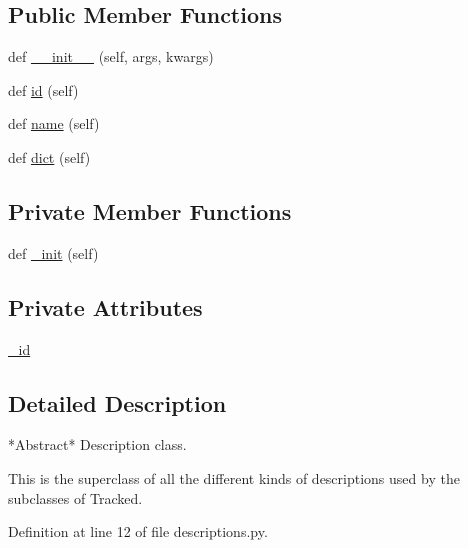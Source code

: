 \subsection*{Public Member Functions}
\begin{DoxyCompactItemize}
\item 
def \hyperlink{classmemoryoracle_1_1descriptions_1_1Description_a4fb6dc4bf9be65d6d1b135a9af46af38}{\+\_\+\+\_\+init\+\_\+\+\_\+} (self, args, kwargs)
\item 
def \hyperlink{classmemoryoracle_1_1descriptions_1_1Description_a793ffb6975ee167869a1f475b1748769}{id} (self)
\item 
def \hyperlink{classmemoryoracle_1_1descriptions_1_1Description_a4b27c3ae1ef0ab35ec0f990fa553b8b3}{name} (self)
\item 
def \hyperlink{classmemoryoracle_1_1descriptions_1_1Description_ab09bce45e6b9a038366ef720a5253506}{dict} (self)
\end{DoxyCompactItemize}
\subsection*{Private Member Functions}
\begin{DoxyCompactItemize}
\item 
def \hyperlink{classmemoryoracle_1_1descriptions_1_1Description_a61b082efab73e7121ad7321bd5d21b84}{\+\_\+init} (self)
\end{DoxyCompactItemize}
\subsection*{Private Attributes}
\begin{DoxyCompactItemize}
\item 
\hyperlink{classmemoryoracle_1_1descriptions_1_1Description_a75740a1e65e4640ddd011d2c98aad5c3}{\+\_\+id}
\end{DoxyCompactItemize}


\subsection{Detailed Description}
\begin{DoxyVerb}*Abstract* Description class.

This is the superclass of all the different kinds of
descriptions used by the subclasses of Tracked.
\end{DoxyVerb}
 

Definition at line 12 of file descriptions.\+py.



